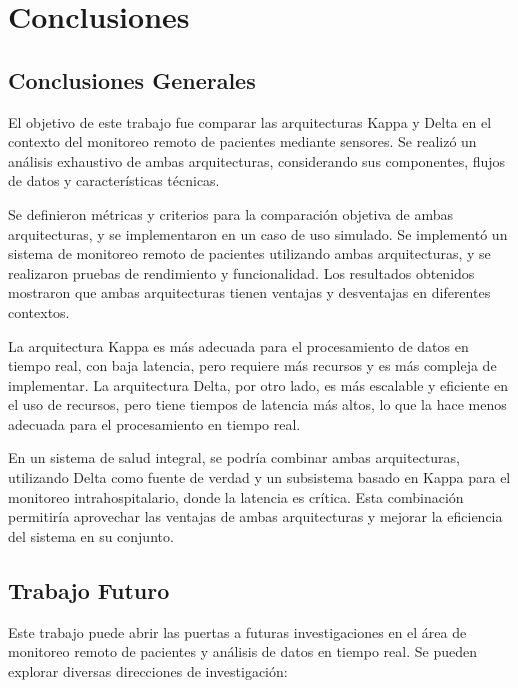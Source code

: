 \chapter{Conclusiones}

\section{Conclusiones Generales}

El objetivo de este trabajo fue comparar las arquitecturas Kappa y Delta en el contexto del monitoreo remoto de pacientes mediante sensores.
Se realizó un análisis exhaustivo de ambas arquitecturas, considerando sus componentes, flujos de datos y características técnicas.\newline

Se definieron métricas y criterios para la comparación objetiva de ambas arquitecturas, y se implementaron en un caso de uso simulado.
Se implementó un sistema de monitoreo remoto de pacientes utilizando ambas arquitecturas, y se realizaron pruebas de rendimiento y funcionalidad.
Los resultados obtenidos mostraron que ambas arquitecturas tienen ventajas y desventajas en diferentes contextos.\newline

La arquitectura Kappa es más adecuada para el procesamiento de datos en tiempo real, con baja latencia, pero requiere más recursos y es más compleja de implementar.
La arquitectura Delta, por otro lado, es más escalable y eficiente en el uso de recursos, pero tiene tiempos de latencia más altos, lo que la hace menos adecuada para el procesamiento en tiempo real.\newline

En un sistema de salud integral, se podría combinar ambas arquitecturas, utilizando Delta como fuente de verdad y un subsistema basado en Kappa para el monitoreo intrahospitalario, donde la latencia es crítica.
Esta combinación permitiría aprovechar las ventajas de ambas arquitecturas y mejorar la eficiencia del sistema en su conjunto.
\newpage
\section{Trabajo Futuro}

Este trabajo puede abrir las puertas a futuras investigaciones en el área de monitoreo remoto de pacientes y análisis de datos en tiempo real.
Se pueden explorar diversas direcciones de investigación:

